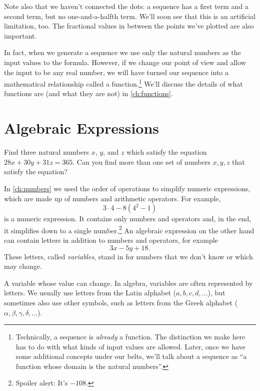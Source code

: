 Note also that we haven't connected the dots: a sequence has a first term and a second term, but no one-and-a-halfth term. We'll soon see that this is an artificial limitation, too. The fractional values in between the points we've plotted are also important.

In fact, when we generate a sequence we use only the natural numbers as the input values to the formula. However, if we change our point of view and allow the input to be any real number, we will have turned our sequence into a mathematical relationship called a \gls{function}.\footnote{Technically, a sequence is \textit{already} a function. The distinction we make here has to do with what kinds of input values are allowed. Later, once we have some additional concepts under our belts, we'll talk about a sequence as ``a function whose domain is the natural numbers''.} We'll discuss the details of what functions are (and what they are not) in \cref{ch:functions}.


\section{Algebraic Expressions}
\label{sec:algexpr}

\begin{boxedexplore}
Find three natural numbers $x$, $y$, and $z$ which satisfy the equation $28x + 30y + 31z = 365$. Can you find more than one set of numbers $x,y,z$ that satisfy the equation?
\end{boxedexplore}

In \cref{ch:numbers} we used the order of operations to simplify numeric expressions, which are made up of numbers and arithmetic operators. For example, \[3\cdot4-8(4^2-1)\] is a numeric expression. It contains only numbers and operators and, in the end, it simplifies down to a single number.\footnote{Spoiler alert: It's $-108$.} An \gls{algebraic expression} on the other hand can contain letters in addition to numbers and operators, for example \[3x - 5y + 18.\] These letters, called \textit{variables}, stand in for numbers that we don't know or which may change.

\begin{boxeddef}[Variable]
A \gls{variable} whose value can change. In algebra, variables are often represented by letters. We usually use letters from the Latin alphabet ($a, b, c, d,\dotsc$), but sometimes also use other symbols, such as letters from the Greek alphabet ($\alpha, \beta, \gamma, \delta, \dotsc$).
\end{boxeddef}

